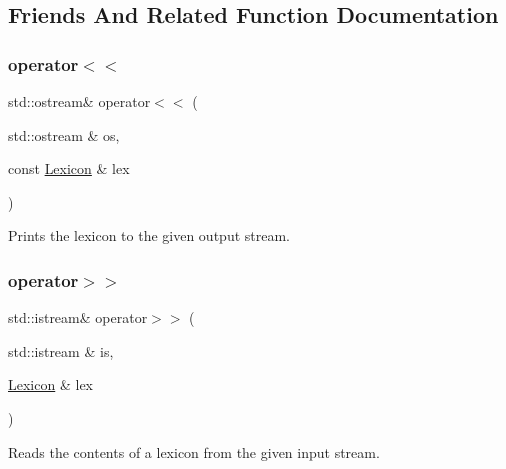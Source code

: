 \subsection{Friends And Related Function Documentation}
\mbox{\label{classLexicon_af4dde954854b1ec1072266b3042d44a6}} 
\subsubsection{\texorpdfstring{operator$<$$<$}{operator<<}}
{\footnotesize\ttfamily std\+::ostream\& operator$<$$<$ (\begin{DoxyParamCaption}\item[{std\+::ostream \&}]{os,  }\item[{const \mbox{\hyperlink{classLexicon}{Lexicon}} \&}]{lex }\end{DoxyParamCaption})\hspace{0.3cm}{\ttfamily [friend]}}



Prints the lexicon to the given output stream. 

\mbox{\label{classLexicon_a1f966ac4d3b3849aa4bc556d995c24ba}} 
\subsubsection{\texorpdfstring{operator$>$$>$}{operator>>}}
{\footnotesize\ttfamily std\+::istream\& operator$>$$>$ (\begin{DoxyParamCaption}\item[{std\+::istream \&}]{is,  }\item[{\mbox{\hyperlink{classLexicon}{Lexicon}} \&}]{lex }\end{DoxyParamCaption})\hspace{0.3cm}{\ttfamily [friend]}}



Reads the contents of a lexicon from the given input stream. 

